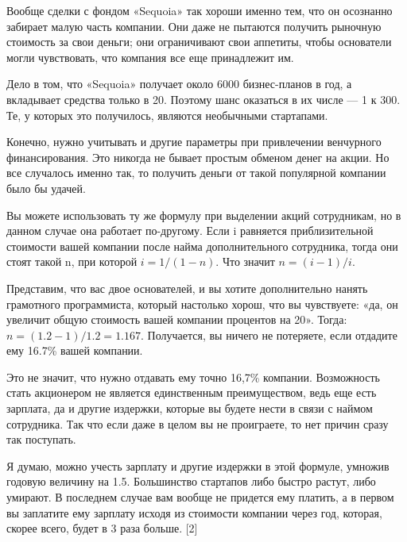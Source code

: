 \documentclass[ebook,12pt,oneside,openany]{memoir}
\begin{document}
Вообще сделки с фондом «Sequoia» так хороши именно тем, что он
осознанно забирает малую часть компании. Они даже не пытаются получить
рыночную стоимость за свои деньги; они ограничивают свои аппетиты,
чтобы основатели могли чувствовать, что компания все еще принадлежит
им. \newline

Дело в том, что «Sequoia» получает около 6000 бизнес-планов в год, а
вкладывает средства только в 20. Поэтому шанс оказаться в их числе — 1
к 300. Те, у которых это получилось, являются необычными стартапами. \newline

Конечно, нужно учитывать и другие параметры при привлечении венчурного
финансирования. Это никогда не бывает простым обменом денег на акции.
Но все случалось именно так, то получить деньги от такой популярной
компании было бы удачей. \newline

Вы можете использовать ту же формулу при выделении акций сотрудникам,
но в данном случае она работает по-другому. Если i равняется
приблизительной стоимости вашей компании после найма дополнительного
сотрудника, тогда они стоят такой n, при которой $i = 1/(1 - n)$. Что
значит $n = (i - 1)/i$. \newline

Представим, что вас двое основателей, и вы хотите дополнительно нанять
грамотного программиста, который настолько хорош, что вы чувствуете:
«да, он увеличит общую стоимость вашей компании процентов на 20».
Тогда: $n = (1.2 - 1)/1.2 = 1.167$. Получается, вы ничего не потеряете,
если отдадите ему 16.7\% вашей компании. \newline

Это не значит, что нужно отдавать ему точно 16,7\% компании.
Возможность стать акционером не является единственным преимуществом,
ведь еще есть зарплата, да и другие издержки, которые вы будете нести
в связи с наймом сотрудника. Так что если даже в целом вы не
проиграете, то нет причин сразу так поступать. \newline

Я думаю, можно учесть зарплату и другие издержки в этой формуле,
умножив годовую величину на 1.5. Большинство стартапов либо быстро
растут, либо умирают. В последнем случае вам вообще не придется ему
платить, а в первом вы заплатите ему зарплату исходя из стоимости
компании через год, которая, скорее всего, будет в 3 раза больше. [2] \newline
\end{document}
